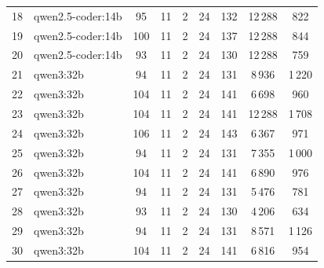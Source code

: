 \begin{table}[htbp]
{\begin{tabular}{|c|l|c|c|c|c|c|c|c|}
18 & qwen2.5-coder:14b &  95 & 11 & 2 & 24 & 132 & 12\,288 & 822 \\
19 & qwen2.5-coder:14b & 100 & 11 & 2 & 24 & 137 & 12\,288 & 844 \\
20 & qwen2.5-coder:14b &  93 & 11 & 2 & 24 & 130 & 12\,288 & 759 \\
\hline
21 & qwen3:32b &  94 & 11 & 2 & 24 & 131 &  8\,936 & 1\,220 \\
22 & qwen3:32b & 104 & 11 & 2 & 24 & 141 &  6\,698 &   960 \\
23 & qwen3:32b & 104 & 11 & 2 & 24 & 141 & 12\,288 & 1\,708 \\
24 & qwen3:32b & 106 & 11 & 2 & 24 & 143 &  6\,367 &   971 \\
25 & qwen3:32b &  94 & 11 & 2 & 24 & 131 &  7\,355 & 1\,000 \\
26 & qwen3:32b & 104 & 11 & 2 & 24 & 141 &  6\,890 &   976 \\
27 & qwen3:32b &  94 & 11 & 2 & 24 & 131 &  5\,476 &   781 \\
28 & qwen3:32b &  93 & 11 & 2 & 24 & 130 &  4\,206 &   634 \\
29 & qwen3:32b &  94 & 11 & 2 & 24 & 131 &  8\,571 & 1\,126 \\
30 & qwen3:32b & 104 & 11 & 2 & 24 & 141 &  6\,816 &   954 \\
\hline
\end{tabular}
}%
\label{tab:rohdaten_runs_100}
\end{table}
 
\clearpage
 
\label{app:modell_summary_100}

